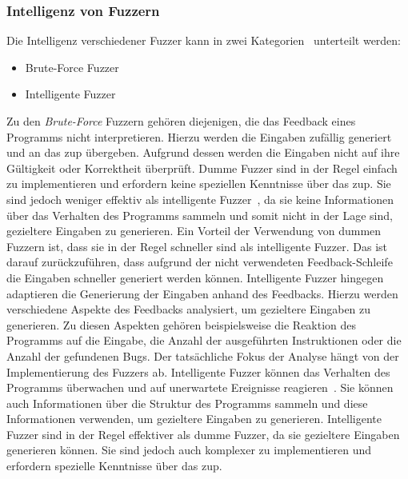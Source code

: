 
\subsubsection{Intelligenz von Fuzzern}\label{subsubsec:intelligenz-von-fuzzern}
Die Intelligenz verschiedener Fuzzer kann in zwei Kategorien~\cite{fuzzer-intelligence} unterteilt werden:
\begin{itemize}
    \item Brute-Force Fuzzer
    \item Intelligente Fuzzer
\end{itemize}
Zu den \textit{Brute-Force} Fuzzern gehören diejenigen, die das Feedback eines Programms nicht interpretieren.
Hierzu werden die Eingaben zufällig generiert und an das \gls{zup} übergeben.
Aufgrund dessen werden die Eingaben nicht auf ihre Gültigkeit oder Korrektheit überprüft.
Dumme Fuzzer sind in der Regel einfach zu implementieren und erfordern keine speziellen Kenntnisse über das \gls{zup}.
Sie sind jedoch weniger effektiv als intelligente Fuzzer~\cite{fuzzer-intelligence}, da sie keine Informationen über das Verhalten des Programms
sammeln und somit nicht in der Lage sind, gezieltere Eingaben zu generieren.
Ein Vorteil der Verwendung von dummen Fuzzern ist, dass sie in der Regel schneller sind als intelligente Fuzzer.
Das ist darauf zurückzuführen, dass aufgrund der nicht verwendeten Feedback-Schleife die Eingaben schneller generiert werden können.\newline\newline
\noindent Intelligente Fuzzer hingegen adaptieren die Generierung der Eingaben anhand des Feedbacks.
Hierzu werden verschiedene Aspekte des Feedbacks analysiert, um gezieltere Eingaben zu generieren.
Zu diesen Aspekten gehören beispielsweise die Reaktion des Programms auf die Eingabe, die Anzahl der ausgeführten Instruktionen
oder die Anzahl der gefundenen Bugs.
Der tatsächliche Fokus der Analyse hängt von der Implementierung des Fuzzers ab.
Intelligente Fuzzer können das Verhalten des Programms überwachen und auf unerwartete Ereignisse reagieren~\cite{smart-fuzzing}.
Sie können auch Informationen über die Struktur des Programms sammeln und diese Informationen verwenden, um gezieltere Eingaben zu generieren.\newline
Intelligente Fuzzer sind in der Regel effektiver als dumme Fuzzer, da sie gezieltere Eingaben generieren können.
Sie sind jedoch auch komplexer zu implementieren und erfordern spezielle Kenntnisse über das \gls{zup}.
